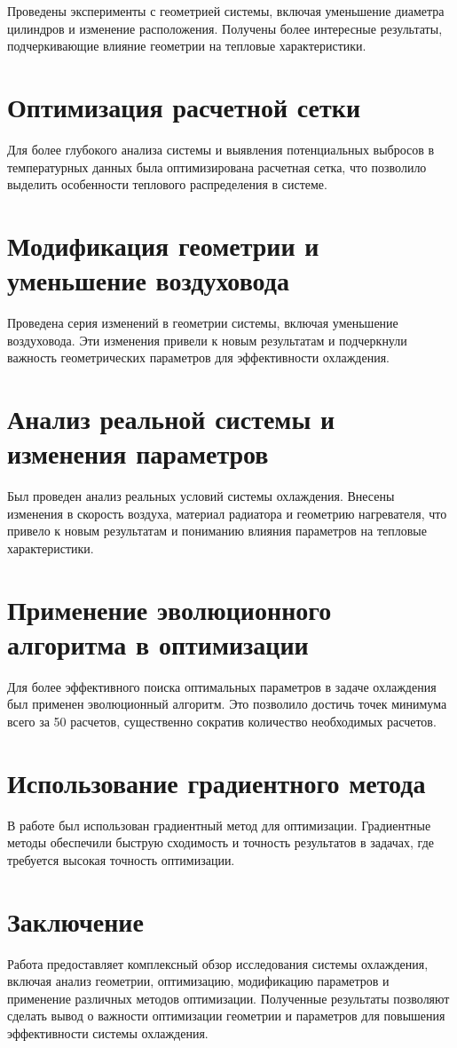 \documentclass{beamer}
\begin{document}
Проведены эксперименты с геометрией системы, включая уменьшение диаметра цилиндров и изменение расположения. Получены более интересные результаты, подчеркивающие влияние геометрии на тепловые характеристики.

\section{Оптимизация расчетной сетки}

Для более глубокого анализа системы и выявления потенциальных выбросов в температурных данных была оптимизирована расчетная сетка, что позволило выделить особенности теплового распределения в системе.

\section{Модификация геометрии и уменьшение воздуховода}

Проведена серия изменений в геометрии системы, включая уменьшение воздуховода. Эти изменения привели к новым результатам и подчеркнули важность геометрических параметров для эффективности охлаждения.

\section{Анализ реальной системы и изменения параметров}

Был проведен анализ реальных условий системы охлаждения. Внесены изменения в скорость воздуха, материал радиатора и геометрию нагревателя, что привело к новым результатам и пониманию влияния параметров на тепловые характеристики.

\section{Применение эволюционного алгоритма в оптимизации}

Для более эффективного поиска оптимальных параметров в задаче охлаждения был применен эволюционный алгоритм. Это позволило достичь точек минимума всего за 50 расчетов, существенно сократив количество необходимых расчетов.

\section{Использование градиентного метода}

В работе был использован градиентный метод для оптимизации. Градиентные методы обеспечили быструю сходимость и точность результатов в задачах, где требуется высокая точность оптимизации.

\section{Заключение}

Работа предоставляет комплексный обзор исследования системы охлаждения, включая анализ геометрии, оптимизацию, модификацию параметров и применение различных методов оптимизации. Полученные результаты позволяют сделать вывод о важности оптимизации геометрии и параметров для повышения эффективности системы охлаждения.

\newpage
\printbibliography
\end{document}
